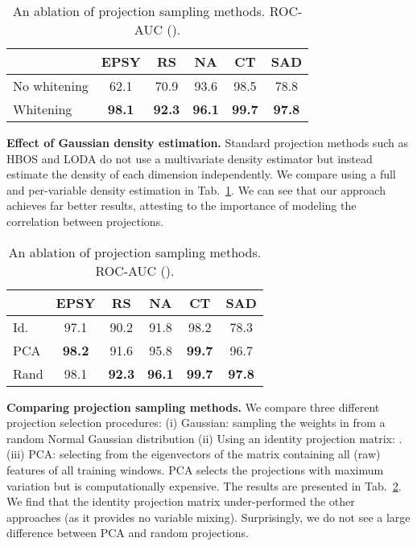 \documentclass{article}
\begin{document}
\begin{table}
\caption{An ablation of projection sampling methods. ROC-AUC  ().}
\centering
\begin{tabular}{lccccc}
\toprule

	&	EPSY	&	RS	&	NA	&	CT	&	SAD	\\ \midrule

No whitening	&	62.1	&	70.9	&	93.6	&	98.5	&	78.8 \\
Whitening	&	\textbf{98.1}	&	\textbf{92.3}	&	\textbf{96.1}	&	\textbf{99.7}	&	\textbf{97.8}	\\ 

\bottomrule
\end{tabular}
\label{tab:ablation_cov}
\end{table}

\textbf{Effect of Gaussian density estimation.} Standard projection methods such as HBOS \cite{goldstein2012histogram} and LODA \cite{pevny2016loda} do not use a multivariate density estimator but instead estimate the density of each dimension independently. We compare using a full and per-variable density estimation in Tab.~\ref{tab:ablation_cov}. We can see that our approach achieves far better results, attesting to the importance of modeling the correlation between projections.  






\begin{table}
\caption{An ablation of projection sampling methods. ROC-AUC  ().}
\centering
\begin{tabular}{lccccc}
\toprule
&	EPSY	&	RS	&	NA	&	CT	&	SAD	\\ \midrule
Id.	&	97.1	&	90.2	&	91.8	&	98.2	&	78.3	\\
PCA	&	\textbf{98.2}	&	91.6	&	95.8	&	\textbf{99.7}	&	96.7	\\
Rand	&	98.1	&	\textbf{92.3}	&	\textbf{96.1}	&	\textbf{99.7}	&	\textbf{97.8}	\\

\bottomrule
\end{tabular}
\label{tab:ablation_proj}
\end{table}

\textbf{Comparing projection sampling methods.} We compare three different projection selection procedures: (i) Gaussian: sampling the weights in  from a random Normal Gaussian distribution (ii) Using an identity projection matrix:  . (iii) PCA: selecting  from the eigenvectors of the matrix containing all (raw) features of all training windows. PCA selects the projections with maximum variation but is computationally expensive. The results are presented in Tab.~\ref{tab:ablation_proj}. We find that the identity projection matrix under-performed the other approaches (as it provides no variable mixing). Surprisingly, we do not see a large difference between PCA and random projections.     
\end{document}
